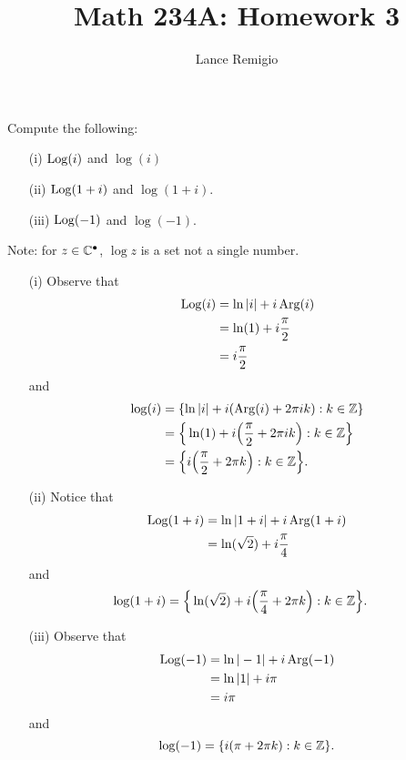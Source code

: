 \documentclass[a4paper]{article}
\title{Math 234A: Homework 3}
\author{Lance Remigio}
\begin{document}
\maketitle    
{}
\rhead{\thepage}

\begin{problem}
    Compute the following:
    \begin{enumerate}
        \item[(i)] \( \operatorname{Log}(i)  \) and \( \log(i) \)
        \item[(ii)] \( \operatorname{Log}(1+i)   \) and \( \log(1+i) \).
        \item[(iii)] \( \operatorname{Log}(-1)  \) and \( \log(-1) \).
    \end{enumerate}
    Note: for \( z \in \mathbb{C}^{\bullet} \), \( \log z  \) is a set not a single number.
\end{problem}

\begin{solution}
\begin{enumerate}
    \item[(i)] Observe that 
        \begin{align*}
            \operatorname{Log}(i) &= \ln | i |  + i \operatorname{Arg}(i) \\
                    &= \ln(1) + i \frac{ \pi }{ 2 }  \\
                    &= i \frac{ \pi }{ 2 } 
        \end{align*}
        and
        \begin{align*}
            \log(i) &= \{ \ln | i |  + i (\operatorname{Arg}(i) + 2\pi i k): k \in \mathbb{Z}  \} \\
                    &= \Big\{ \ln(1) + i \Big(  \frac{ \pi  }{  2  }  + 2 \pi i k\Big) : k \in \mathbb{Z}  \Big\} \\
                    &= \Big\{ i \Big(  \frac{ \pi }{ 2 }  + 2 \pi k  \Big): k \in \mathbb{Z} \Big\}. 
        \end{align*}
    \item[(ii)] Notice that 
        \begin{align*}
            \operatorname{Log}(1+i) &= \ln | 1 + i  | + i \operatorname{Arg}(1+i) \\
                      &= \ln(\sqrt{ 2 }) + i \frac{ \pi }{ 4 }
        \end{align*}
        and
        \begin{align*}
            \log(1+i) &= \Big\{\ln(\sqrt{ 2 }) + i \Big(\frac{ \pi }{ 4 }  + 2 \pi k   \Big) : k \in \mathbb{Z} \Big\}.   
        \end{align*}
    \item[(iii)] Observe that
        \begin{align*}
            \operatorname{Log}(-1) &= \ln | -1 |  + i \operatorname{Arg}(-1) \\
                     &= \ln | 1 |  + i \pi \\  
                     &= i \pi
        \end{align*}
        and
        \[ \log(-1) = \{ i (\pi + 2 \pi k ) : k \in \mathbb{Z}  \}.  \]
\end{enumerate}    
\end{solution}
\end{document}
